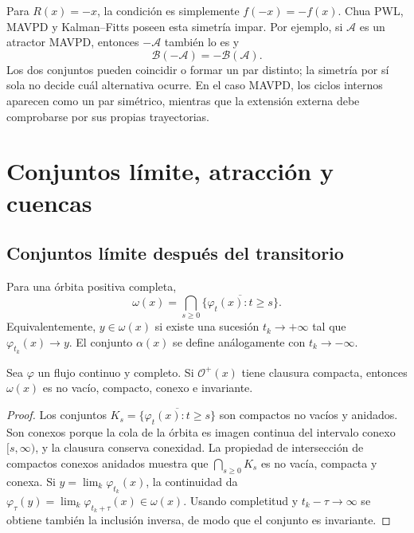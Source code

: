 Para \(R(x)=-x\), la condición es simplemente \(f(-x)=-f(x)\). Chua PWL,
MAVPD y Kalman--Fitts poseen esta simetría impar. Por ejemplo, si
\(\mathcal A\) es un atractor MAVPD, entonces \(-\mathcal A\) también lo es y
\begin{equation}
 \mathcal B(-\mathcal A)=-\mathcal B(\mathcal A).
 \label{geo:eq:symmetric-basins}
\end{equation}
Los dos conjuntos pueden coincidir o formar un par distinto; la simetría por
sí sola no decide cuál alternativa ocurre. En el caso MAVPD, los ciclos
internos aparecen como un par simétrico, mientras que la extensión externa
debe comprobarse por sus propias trayectorias.

\fi
\HAFOGeoRenderBlocktrue
\ifdefined\HAFOGeoBlockSelect
  \HAFOGeoRenderBlockfalse
  \ifdefined\HAFOGeoBlockBasins\HAFOGeoRenderBlocktrue\fi
\fi
\ifHAFOGeoRenderBlock
\HAFOStudyNeedspace
\section{Conjuntos límite, atracción y cuencas}
\label{sec:geo-limit-basins}

\HAFOCardBasins

\subsection{Conjuntos límite después del transitorio}

\begin{definition}
Para una órbita positiva completa,
\begin{equation}
 \omega(x)=
 \bigcap_{s\ge0}\overline{\{\varphi_t(x):t\ge s\}}.
 \label{geo:eq:omega-limit}
\end{equation}
Equivalentemente, \(y\in\omega(x)\) si existe una sucesión
\(t_k\to+\infty\) tal que \(\varphi_{t_k}(x)\to y\). El conjunto
\(\alpha(x)\) se define análogamente con \(t_k\to-\infty\).
\end{definition}

\begin{proposition}
Sea \(\varphi\) un flujo continuo y completo. Si
\(\mathcal O^+(x)\) tiene clausura compacta, entonces \(\omega(x)\) es no
vacío, compacto, conexo e invariante.
\end{proposition}

\begin{proof}
Los conjuntos
\(K_s=\overline{\{\varphi_t(x):t\ge s\}}\) son compactos no vacíos y
anidados. Son conexos porque la cola de la órbita es imagen continua del
intervalo conexo \([s,\infty)\), y la clausura conserva conexidad.
La propiedad de intersección de compactos conexos anidados muestra que
\(\bigcap_{s\ge0}K_s\) es no vacía, compacta y conexa. Si
\(y=\lim_k\varphi_{t_k}(x)\), la continuidad da
\(\varphi_\tau(y)=\lim_k\varphi_{t_k+\tau}(x)\in\omega(x)\). Usando
completitud y \(t_k-\tau\to\infty\) se obtiene también la inclusión inversa,
de modo que el conjunto es invariante.
\end{proof}


